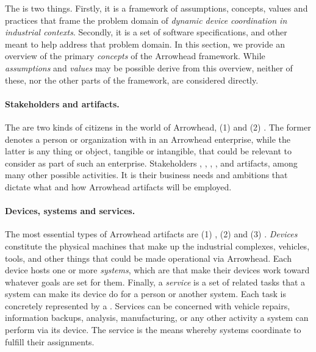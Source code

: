 %
%

The  is two things.
Firstly, it is a framework of assumptions, concepts, values and practices that frame the problem domain of \textit{dynamic device coordination in industrial contexts}.
Secondly, it is a set of software specifications,  and other  meant to help address that problem domain.
In this section, we provide an overview of the primary \textit{concepts} of the Arrowhead framework.
While \textit{assumptions} and \textit{values} may be possible derive from this overview, neither of these, nor the other parts of the framework, are considered directly.

\paragraph{Stakeholders and artifacts.}
The are two kinds of citizens in the world of Arrowhead, (1)  and (2) .
The former denotes a person or organization with  in an Arrowhead enterprise, while the latter is any thing or object, tangible or intangible, that could be relevant to consider as part of such an enterprise.
Stakeholders , , , , and  artifacts, among many other possible activities.
It is their business needs and ambitions that dictate what and how Arrowhead artifacts will be employed.

\paragraph{Devices, systems and services.}
The most essential types of Arrowhead artifacts are (1) , (2)  and (3) .
\textit{Devices} constitute the physical machines that make up the industrial complexes, vehicles, tools, and other things that could be made operational via Arrowhead.
Each device hosts one or more \textit{systems}, which are   that make their devices work toward whatever goals are set for them.
Finally, a \textit{service} is a set of related tasks that a system can make its device do for a person or another system.
Each task is concretely represented by a .
Services can be concerned with vehicle repairs, information backups, analysis, manufacturing, or any other activity a system can perform via its device.
The service is the means whereby systems coordinate to fulfill their assignments.

